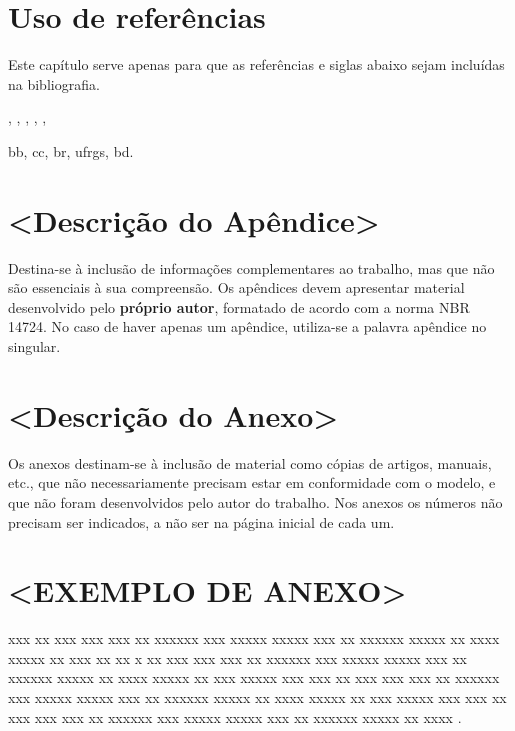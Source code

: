 \documentclass[
	oneside,
	english,brazil,				%
	mestrado,ppgc
	]
	{infufrgs}
\begin{document}
\chapter{Uso de referências}
Este capítulo serve apenas para que as referências e siglas abaixo sejam incluídas na bibliografia.

\cite{goncalves}, \cite{lisboa}, \cite{high}, \cite{krieger}, \cite{goncalves2}, \cite{pedrosa}

\ac{bb}, \ac{cc}, \ac{br}, \ac{ufrgs}, \ac{bd}.




\apendices
\chapter{<Descrição do Apêndice>}
Destina-se à inclusão de informações complementares ao trabalho, mas que não são
essenciais à sua compreensão. Os apêndices devem apresentar material desenvolvido pelo
\textbf{próprio autor}, formatado de acordo com a norma NBR 14724. No caso de haver apenas um
apêndice, utiliza-se a palavra apêndice no singular.

\anexos
\chapter{<Descrição do Anexo>}
Os anexos destinam-se à inclusão de material como cópias de artigos, manuais, etc.,
que não necessariamente precisam estar em conformidade com o modelo, e que não foram
desenvolvidos pelo autor do trabalho. Nos anexos os números não precisam ser indicados, a
não ser na página inicial de cada um.

\chapter{<EXEMPLO DE ANEXO>}
xxx xx xxx xxx xxx xx xxxxxx xxx xxxxx xxxxx xxx xx xxxxxx xxxxx xx xxxx xxxxx xx xxx xx
xx x xx xxx xxx xxx xx xxxxxx xxx xxxxx xxxxx xxx xx xxxxxx xxxxx xx xxxx xxxxx xx xxx xxxxx xxx
xxx xx xxx xxx xxx xx xxxxxx xxx xxxxx xxxxx xxx xx xxxxxx xxxxx xx xxxx xxxxx xx xxx xxxxx xxx
xxx xx xxx xxx xxx xx xxxxxx xxx xxxxx xxxxx xxx xx xxxxxx xxxxx xx xxxx .
\end{document}
